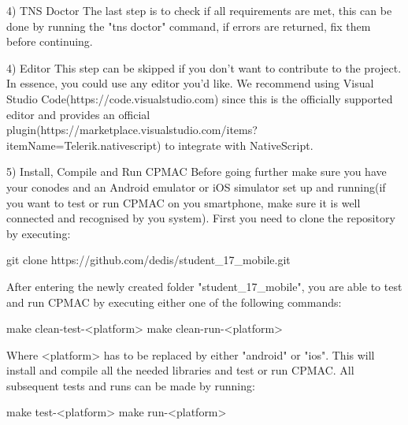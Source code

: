     4) TNS Doctor
    The last step is to check if all requirements are met, this can be done by running the "tns doctor" command, if errors are returned, fix them before continuing.

4) Editor
This step can be skipped if you don't want to contribute to the project. In essence, you could use any editor you'd like. We recommend using Visual Studio Code(https://code.visualstudio.com) since this is the officially supported editor and provides an official plugin(https://marketplace.visualstudio.com/items?itemName=Telerik.nativescript) to integrate with NativeScript.

5) Install, Compile and Run CPMAC
Before going further make sure you have your conodes and an Android emulator or iOS simulator set up and running(if you want to test or run CPMAC on you smartphone, make sure it is well connected and recognised by you system).
First you need to clone the repository by executing:

    git clone https://github.com/dedis/student\_17\_mobile.git

After entering the newly created folder "student\_17\_mobile", you are able to test and run CPMAC by executing either one of the following commands:

    make clean-test-<platform>
    make clean-run-<platform>

Where <platform> has to be replaced by either "android" or "ios". This will install and compile all the needed libraries and test or run CPMAC. All subsequent tests and runs can be made by running:

    make test-<platform>
    make run-<platform>
